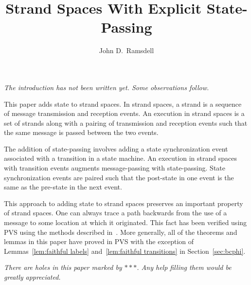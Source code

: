\documentclass[12pt]{article}
\title{Strand Spaces With Explicit State-Passing}
\author{John D.~Ramsdell}
\newenvironment{note}{\begingroup\itshape}{\endgroup}
\newcommand{\seq}[1]{\ensuremath{\langle#1\rangle}}
\begin{document}
\maketitle

\begin{note}
  The introduction has not been written yet.  Some observations follow.
\end{note}

This paper adds state to strand spaces.  In strand spaces, a strand is
a sequence of message transmission and reception events.  An execution
in strand spaces is a set of strands along with a pairing of
transmission and reception events such that the same message is passed
between the two events.

The addition of state-passing involves adding a state synchronization
event associated with a transition in a state machine.  An execution
in strand spaces with transition events augments message-passing with
state-passing.  State synchronization events are paired such that the
post-state in one event is the same as the pre-state in the next
event.

This approach to adding state to strand spaces preserves an important
property of strand spaces.  One can always trace a path backwards from
the use of a message to some location at which it originated.  This
fact has been verified using PVS using the methods described
in~\cite{Ramsdell13}.  More generally, all of the theorems and lemmas
in this paper have proved in PVS with the exception of
Lemmas~\ref{lem:faithful labels} and~\ref{lem:faithful transitions} in
Section~\ref{sec:bcphi}.

\begin{note}
  There are holes in this paper marked by $\ast\ast\ast$.  Any help
  filling them would be greatly appreciated.
\end{note}


\end{document}
